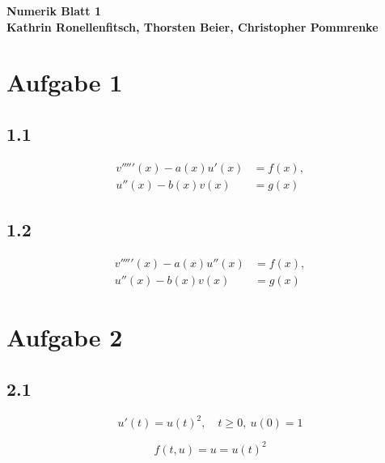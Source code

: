 \documentclass[10pt,oneside,a4paper]{scrartcl}
\begin{document}

	\begin{center}
		\huge %
		\bfseries %
		\sffamily %
		Numerik Blatt 1\\[1em]
		\normalsize
		Kathrin Ronellenfitsch, Thorsten Beier, Christopher Pommrenke
	\end{center}

	
	\section*{Aufgabe 1}

    		\subsection*{1.1}

		\begin{align*}
			v'''''(x) - a(x)u'(x) &= f(x),	\\
			u''(x) - b(x)v(x) &= g(x)
		\end{align*}

		
		 \subsection*{1.2}

		\begin{align*}
			v'''''(x) - a(x)u''(x) &= f(x),	\\
			u''(x) - b(x)v(x) &= g(x)
		\end{align*}



	\section*{Aufgabe 2}

  		\subsection*{2.1}

		\begin{equation*}
			u'(t) = u(t)^2,\quad t \geq 0, \ u(0) = 1
		\end{equation*}
		
		\begin{equation*}
			f(t,u) = u =  u(t)^2
		\end{equation*}
\end{document}
